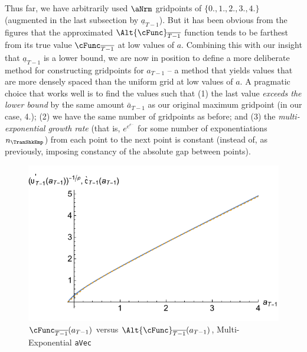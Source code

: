 \documentclass[titlepage, headings=optiontotocandhead]{\econtex}
\begin{document}
Thus far, we have arbitrarily used $\aNrm$ gridpoints of
$\{0.,1.,2.,3.,4.\}$ (augmented in the last subsection by
$\underline{a}_{T-1}$).  But it has been obvious from the figures that
the approximated $\Alt{\cFunc}_{\overline{T-1}}$ function tends to be farthest from its true
value $\cFunc_{\overline{T-1}}$ at low values of ${a}$.  Combining this with our insight that
$\underline{a}_{T-1}$ is a lower bound, we are now in position to
define a more deliberate method for constructing gridpoints for
${a}_{T-1}$ -- a method that yields values that are more densely
spaced than the uniform grid at low values of ${a}$.  A pragmatic
choice that works well is to find the values such that (1) the last
value \textit{exceeds the lower bound} by the same amount $\bar{a}_{T-1}$
as our original maximum gridpoint (in our case, 4.); (2) we have the
same number of gridpoints as before; and (3) the \textit{multi-exponential growth rate} (that is, $e^{e^{e^{...}}}$ for some
number of exponentiations $n_{\TranShkEmp}$) from each point to the next point is
constant (instead of, as previously, imposing constancy of the
absolute gap between points).

\hypertarget{GothVInvVSGothCEEE}{}
\begin{figure}
  \includegraphics{./Figures/GothVInvVSGothCEEE}
  \caption{$\cFunc_{\overline{T-1}}({a}_{T-1})$ versus
    $\Alt{\cFunc}_{\overline{T-1}}({a}_{T-1})$, Multi-Exponential \texttt{aVec}}
  \label{fig:GothVInvVSGothCEE}
\end{figure}
\end{document}
